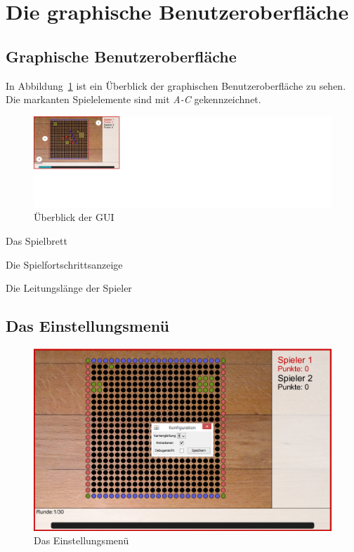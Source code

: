 \documentclass[a4paper, ngerman]{scrartcl}
\begin{document}
\section{Die graphische Benutzeroberfläche}
\subsection{Graphische Benutzeroberfläche}
	In Abbildung~\ref{fig:GUI} ist ein Überblick der graphischen Benutzeroberfläche
	zu sehen. Die markanten Spielelemente sind mit \emph{A-C} gekennzeichnet.
	
	 \begin{figure}[h!]
		\centering		
		\includegraphics[scale = 0.6]{bilder/uebersicht.png} 
		\caption{Überblick der GUI}
		\label{fig:GUI}
	\end{figure} 
\begin{compactenum}[A)] 
\item Das Spielbrett
\item Die Spielfortschrittsanzeige  
\item Die Leitungslänge der Spieler
	\end{compactenum}
	
\subsection{Das Einstellungsmenü} 
	 \begin{figure}[h!]
		\centering
		\includegraphics[scale=0.6]{bilder/konfiguration.png}
		\caption{Das Einstellungsmenü}
		\label{fig:Configuration}
	\end{figure}
	
\end{document}
